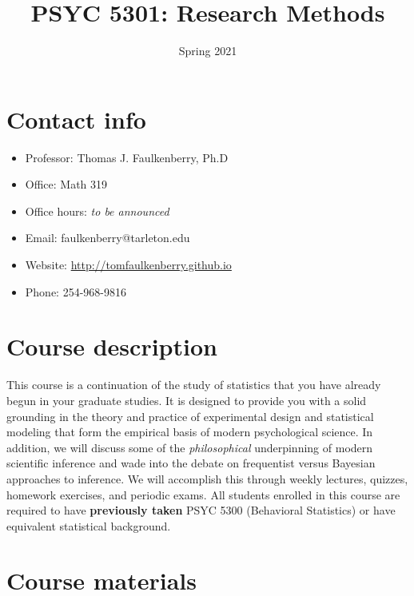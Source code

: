 \documentclass[10pt]{article}
\date{Spring 2021}
\title{PSYC 5301: Research Methods}
\begin{document}
\maketitle

\section*{Contact info}
\label{sec:orged761c6}
\begin{itemize}
\item Professor: Thomas J. Faulkenberry, Ph.D
\item Office: Math 319
\item Office hours: \emph{to be announced}
\item Email: faulkenberry@tarleton.edu
\item Website: \url{http://tomfaulkenberry.github.io}
\item Phone: 254-968-9816
\end{itemize}

\section*{Course description}
\label{sec:org14bf176}

This course is a continuation of the study of statistics that you have already begun in your graduate studies. It is designed to provide you with a solid grounding in the theory and practice of experimental design and statistical modeling that form the empirical basis of modern psychological science. In addition, we will discuss some of the \emph{philosophical} underpinning of modern scientific inference and wade into the debate on frequentist versus Bayesian approaches to inference.  We will accomplish this through weekly lectures, quizzes, homework exercises, and periodic exams. All students enrolled in this course are required to have \textbf{previously taken} PSYC 5300 (Behavioral Statistics) or have equivalent statistical background.

\section*{Course materials}
\label{sec:org8ca1b25}
\end{document}
